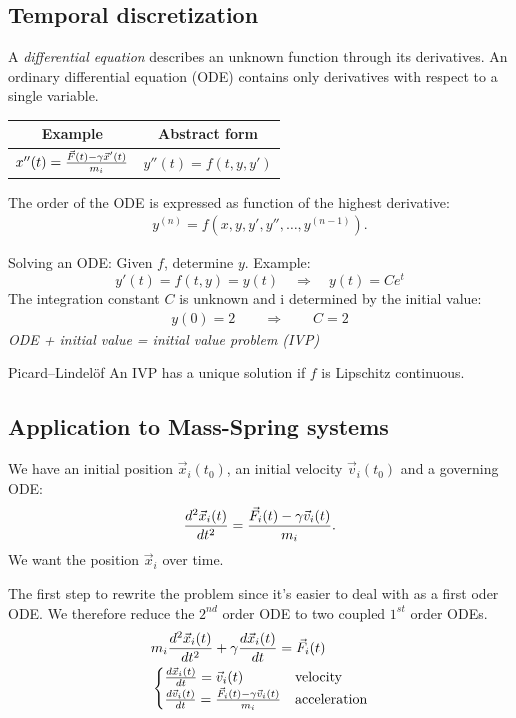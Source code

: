 \begin{multicols}{2}
\section{Temporal discretization}
A \emph{differential equation} describes an unknown function through its derivatives. An ordinary differential equation (ODE) contains only derivatives with respect to a single variable.

\begin{tabular}{c|c}
	\textbf{Example}&\textbf{Abstract form}\\ \hline
	$x''(t) = {\vec F(t) - \gamma \vec x'(t) \over m_i}$&
	$y''(t) = f(t, y, y')$
\end{tabular}
The order of the ODE is expressed as function of the highest derivative:
\begin{align*}
	y^{(n)} = f(x, y, y',y'',\ldots,y^{(n-1)}).
\end{align*}

Solving an ODE: Given $f$, determine $y$. Example:
\[
	y'(t) = f(t,y) = y(t) \quad \Longrightarrow\quad y(t) = Ce^t
\]
The integration constant $C$ is unknown and i determined by the initial value:
\begin{align*}
	y(0) =2 \qquad \Longrightarrow \qquad C = 2
\end{align*}
\emph{ODE + initial value = initial value problem (IVP)}

\begin{theorem}{Picard–Lindelöf}
An IVP has a unique solution if $f$ is Lipschitz continuous.
\end{theorem}
\subsection{Application to Mass-Spring systems}
We have an initial position $\vec x_i(t_0)$, an initial velocity $\vec v_i (t_0)$ and a governing ODE:
\begin{align*}
	{d^2 \vec x_i (t) \over dt^2} = {\vec F_i(t) - \gamma \vec v_i(t) \over m_i}.
\end{align*}
We want the position $\vec x_i$ over time. 

The first step to rewrite the problem since it's easier to deal with as a first oder ODE. We therefore reduce the $2^{nd}$ order ODE to two coupled $1^{st}$ order ODEs.
\begin{align*}
	&m_i {d^2 \vec x_i(t) \over dt^2} + \gamma {d \vec x_i (t) \over dt} = \vec F_i (t) \\
	&\begin{cases}
		{d \vec x_i(t) \over dt} = \vec v_i (t) & \text{velocity} \\
		{d \vec v_i(t) \over dt} = {\vec F_i (t) - \gamma \vec v_i (t) \over m_i} & \text{acceleration}
	\end{cases}
\end{align*}


\end{multicols}
